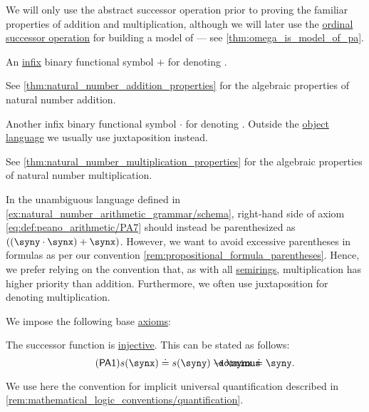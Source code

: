 \begin{definition}
\begin{thmenum}[series=def:peano_arithmetic]
    We will only use the abstract successor operation prior to proving the familiar properties of addition and multiplication, although we will later use the \hyperref[def:ordinal_successor]{ordinal successor operation} for building a model of  --- see \cref{thm:omega_is_model_of_pa}.

     An \hyperref[rem:first_order_formula_conventions/infix]{infix} binary functional symbol \( + \) for denoting .

    See \cref{thm:natural_number_addition_properties} for the algebraic properties of natural number addition.

     Another infix binary functional symbol \( \cdot \) for denoting . Outside the \hyperref[con:metalogic]{object language} we usually use juxtaposition instead.

    See \cref{thm:natural_number_multiplication_properties} for the algebraic properties of natural number multiplication.

    In the unambiguous language defined in \cref{ex:natural_number_arithmetic_grammar/schema}, right-hand side of axiom \eqref{eq:def:peano_arithmetic/PA7} should instead be parenthesized as \( ((\syny \cdot \synx) + \synx) \). However, we want to avoid excessive parentheses in formulas as per our convention \cref{rem:propositional_formula_parentheses}. Hence, we prefer relying on the convention that, as with all \hyperref[def:semiring]{semirings}, multiplication has higher priority than addition. Furthermore, we often use juxtaposition for denoting multiplication.
  \end{thmenum}

  We impose the following base \hyperref[def:first_order_theory/axiomatized]{axioms}:
  \begin{thmenum}[resume=def:peano_arithmetic]
     The successor function is \hyperref[thm:function_invertibility_categorical/nonempty_left_invertible]{injective}. This can be stated as follows:
    \begin{equation}\label{eq:def:peano_arithmetic/PA1}\tag{\logic{PA1}}
      s(\synx) \syneq s(\syny) \synimplies \synx \syneq \syny.
    \end{equation}

    We use here the convention for implicit universal quantification described in \cref{rem:mathematical_logic_conventions/quantification}.


\end{thmenum}
\end{definition}
